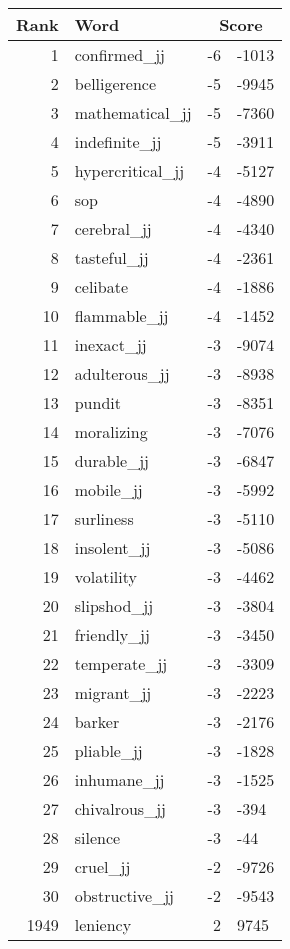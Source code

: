 \begin{longtable}[!htbp]{| rlr@{.}l |}
    \hline
    \textbf{Rank} & \textbf{Word} & \multicolumn{2}{c|}{\textbf{Score}} \\
    \hline
    \endhead
    1 & confirmed\_jj & -6 & -1013 \\
    2 & belligerence & -5 & -9945 \\
    3 & mathematical\_jj & -5 & -7360 \\
    4 & indefinite\_jj & -5 & -3911 \\
    5 & hypercritical\_jj & -4 & -5127 \\
    6 & sop & -4 & -4890 \\
    7 & cerebral\_jj & -4 & -4340 \\
    8 & tasteful\_jj & -4 & -2361 \\
    9 & celibate & -4 & -1886 \\
    10 & flammable\_jj & -4 & -1452 \\
    11 & inexact\_jj & -3 & -9074 \\
    12 & adulterous\_jj & -3 & -8938 \\
    13 & pundit & -3 & -8351 \\
    14 & moralizing & -3 & -7076 \\
    15 & durable\_jj & -3 & -6847 \\
    16 & mobile\_jj & -3 & -5992 \\
    17 & surliness & -3 & -5110 \\
    18 & insolent\_jj & -3 & -5086 \\
    19 & volatility & -3 & -4462 \\
    20 & slipshod\_jj & -3 & -3804 \\
    21 & friendly\_jj & -3 & -3450 \\
    22 & temperate\_jj & -3 & -3309 \\
    23 & migrant\_jj & -3 & -2223 \\
    24 & barker & -3 & -2176 \\
    25 & pliable\_jj & -3 & -1828 \\
    26 & inhumane\_jj & -3 & -1525 \\
    27 & chivalrous\_jj & -3 & -394 \\
    28 & silence & -3 & -44 \\
    29 & cruel\_jj & -2 & -9726 \\
    30 & obstructive\_jj & -2 & -9543 \\
    1949 & leniency & 2 & 9745 \\

\end{longtable}
